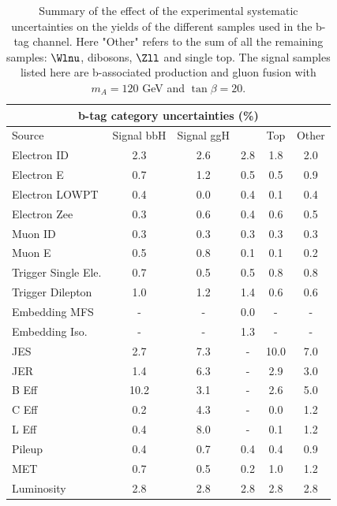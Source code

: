 \begin{table}[tp]
  \centering
  \begin{tabular}{lccccc}
    \hline\hline
      	      		   \multicolumn{6}{c}{ b-tag category uncertainties (\%)}  \\
     \hline
      Source             & Signal bbH 	   & Signal ggH      & \Ztautau      &  Top 	& Other	 \\
    \hline
Electron ID  		 &2.3		   &2.6		     &	2.8          &1.8	&2.0	 \\
Electron E	  	 &0.7		   &1.2		     &0.5	     &0.5	&0.9	 \\
Electron LOWPT	  	 &0.4		   &0.0		     &0.4	     &0.1	&0.4	 \\ 
Electron Zee	  	 &0.3		   &0.6		     &0.4	     &0.6	&0.5	 \\
Muon ID 		 &0.3		   &0.3	   	     &0.3	     &0.3	&0.3	 \\
Muon E		  	 &0.5		   &0.8		     &0.1	     &0.1	&0.2	 \\
Trigger Single	Ele.  	 &0.7		   &0.5		     &0.5	     &0.8	&0.8	 \\
Trigger Dilepton  	 &1.0		   &1.2		     &1.4	     &0.6	&0.6	 \\
Embedding MFS	  	 &-		   &-		     &0.0	     &-		&-	 \\
Embedding Iso.	  	 &-		   &-		     &1.3	     &-		&-	 \\
JES		  	 &2.7		   &7.3		     &-		     &10.0	&7.0	 \\
JER		  	 &1.4		   &6.3		     &-		     &2.9	&3.0	 \\
B Eff		  	 &10.2		   &3.1		     &-		     &2.6	&5.0	 \\
C Eff		  	 &0.2		   &4.3		     &-		     &0.0	&1.2	 \\
L Eff		  	 &0.4		   &8.0		     &-		     &0.1	&1.2	 \\
Pileup			 &0.4		   &0.7		     &0.4	     &0.4	&0.9	 \\
MET 		  	 &0.7		   &0.5 	     &0.2	     &1.0	&1.2	 \\
Luminosity	  	 &2.8 		   &2.8	 	     &2.8 	     &2.8 	&2.8 	 \\

    \hline
    \hline
  \end{tabular}
  \caption{Summary of the effect of the experimental systematic uncertainties on the yields of the different
	samples used  in the b-tag channel. Here "Other" refers to the sum of all the remaining samples: $\Wlnu$, 
	dibosons, $\Zll$ and single top. The signal samples listed here are b-associated production and gluon 
	fusion with $m_{A}=120$ GeV and $\tan\beta=20$.} 

  \label{tab:ExpSys:btag}
\end{table}



